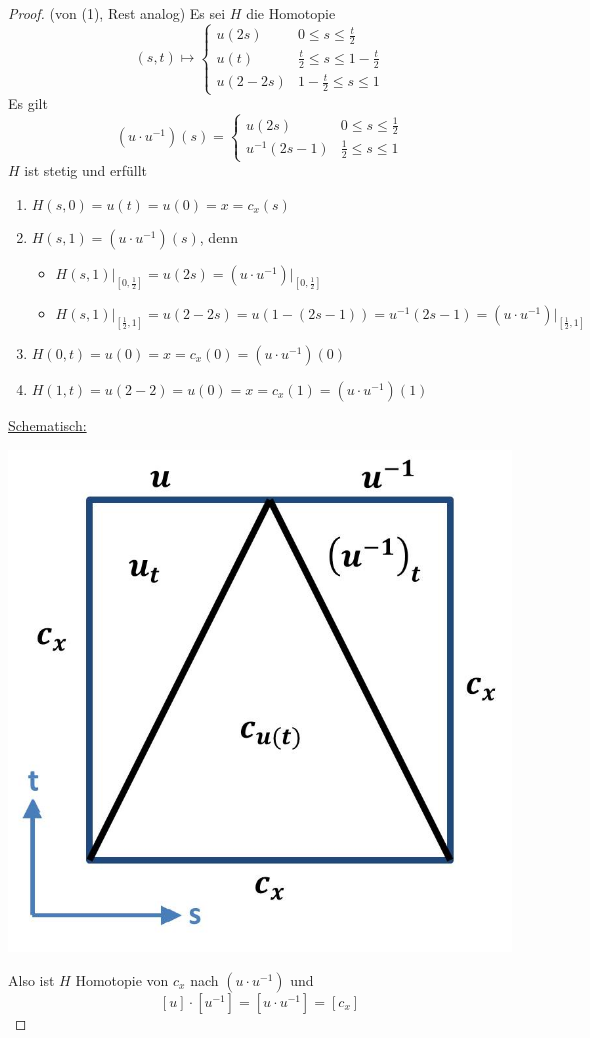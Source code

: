\documentclass[a4paper,11pt,notitlepage]{report}
\theoremstyle{definition}
\begin{document}
\begin{proof} (von (1), Rest analog)
\newline
Es sei $H$ die Homotopie 
$$(s,t) \mapsto \begin{cases} u(2s) & 0 \leq s \leq \frac{t}{2} \\ u(t) & \frac{t}{2} \leq s \leq 1- \frac{t}{2} \\ u(2-2s) & 1-\frac{t}{2} \leq s \leq 1 \end{cases}$$
Es gilt 
$$(u \cdot u^{-1})(s) = \begin{cases} u(2s) & 0 \leq s \leq \frac{1}{2} \\ u^{-1}(2s-1) & \frac{1}{2} \leq s \leq 1 \end{cases}$$
$H$ ist stetig und erfüllt
\begin{enumerate}
	\item $H(s,0) = u(t) = u(0) = x = c_x(s)$
	\item $H(s,1) = (u \cdot u^{-1})(s)$, denn
	\begin{itemize}
		\item $H(s,1) \big |_{[0, \frac{1}{2}]} = u(2s) = (u \cdot u^{-1}) \big |_{[0, \frac{1}{2}]}$
		\item $H(s,1) \big |_{[\frac{1}{2},1]} = u(2-2s) = u(1-(2s-1)) = u^{-1}(2s-1) = (u \cdot u^{-1}) \big |_{[\frac{1}{2},1]}$  
	\end{itemize}
	\item $H(0,t) = u(0) = x = c_x(0) = (u \cdot u^{-1})(0)$
	\item $H(1,t) = u(2-2) = u(0) = x = c_x(1) = (u \cdot u^{-1})(1)$
\end{enumerate}

\underline{Schematisch:} 
\begin{center}
	\includegraphics[scale=0.4]{images/Beweis_Produkt_Lemma.jpg}
\end{center}

Also ist $H$ Homotopie von $c_x$ nach $(u \cdot u^{-1})$ und $$[u] \cdot [u^{-1}] = [u \cdot u^{-1}] = [c_x]$$
\end{proof}
\end{document}
